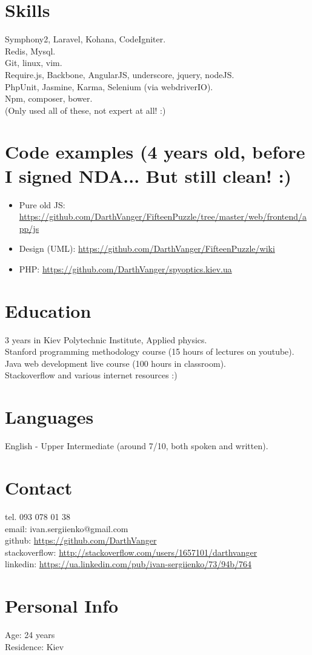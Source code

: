 \documentclass[a4paper, 14pt]{article}
\begin{document}
\section{Skills}
    Symphony2, Laravel, Kohana, CodeIgniter. \\
    Redis, Mysql. \\
	Git, linux, vim. \\
    Require.js, Backbone, AngularJS, underscore, jquery, nodeJS. \\
    PhpUnit, Jasmine, Karma, Selenium (via webdriverIO). \\
    Npm, composer, bower. \\
    (Only used all of these, not expert at all! :) 

\section{Code examples (4 years old, before I signed NDA... But still clean! :)}
\begin{itemize}
    \item Pure old JS: \url{https://github.com/DarthVanger/FifteenPuzzle/tree/master/web/frontend/app/js}
    \\
  \item Design (UML): \url{https://github.com/DarthVanger/FifteenPuzzle/wiki}
    \\
    \item PHP:  \url{https://github.com/DarthVanger/spyoptics.kiev.ua}
\end{itemize}

\section{Education}
	3 years in Kiev Polytechnic Institute, Applied physics. \\
	Stanford programming methodology course (15 hours of lectures on youtube). \\
	Java web development live course (100 hours in classroom). \\
	Stackoverflow and various internet resources :)
\section{Languages}
	English - Upper Intermediate (around 7/10, both spoken and written).
\section{Contact}
	tel. 093 078 01 38 \\
	email: ivan.sergiienko@gmail.com \\
    github: \url{https://github.com/DarthVanger} \\
    stackoverflow: \url{http://stackoverflow.com/users/1657101/darthvanger} \\
    linkedin: \url{https://ua.linkedin.com/pub/ivan-sergiienko/73/94b/764}
\section{Personal Info}
	Age: 24 years \\
	Residence: Kiev
\end{document}
